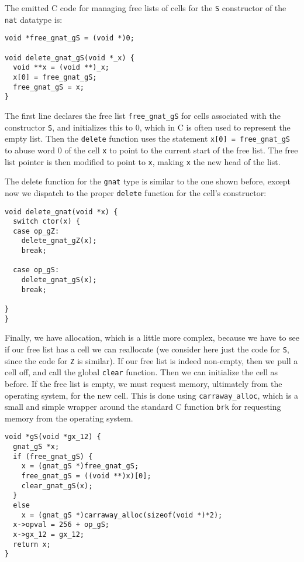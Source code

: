 \documentclass{book}[12pt]
\begin{document}
The emitted C code for managing free lists of cells for the \texttt{S}
constructor of the \texttt{nat} datatype is:

\begin{verbatim}
void *free_gnat_gS = (void *)0;

void delete_gnat_gS(void *_x) {
  void **x = (void **)_x;
  x[0] = free_gnat_gS;
  free_gnat_gS = x;
}
\end{verbatim}

\noindent The first line declares the free list
\texttt{free\_gnat\_gS} for cells associated with the constructor
\texttt{S}, and initializes this to $0$, which in C is often used to
represent the empty list.  Then the \texttt{delete} function uses the
statement \texttt{x[0] = free\_gnat\_gS} to abuse word 0 of the cell
\texttt{x} to point to the current start of the free list.  The free
list pointer is then modified to point to \texttt{x}, making
\texttt{x} the new head of the list.  

The delete function for the \texttt{gnat} type is similar to the one
shown before, except now we dispatch to the proper \texttt{delete}
function for the cell's constructor:

\begin{verbatim}
void delete_gnat(void *x) {
  switch ctor(x) {
  case op_gZ: 
    delete_gnat_gZ(x);
    break;

  case op_gS: 
    delete_gnat_gS(x);
    break;

}
}
\end{verbatim}

Finally, we have allocation, which is a little more complex, because
we have to see if our free list has a cell we can reallocate (we
consider here just the code for \texttt{S}, since the code for
\texttt{Z} is similar).  If our free list is indeed non-empty, then we
pull a cell off, and call the global \texttt{clear} function.  Then we
can initialize the cell as before.  If the free list is empty, we must
request memory, ultimately from the operating system, for the new
cell.  This is done using \texttt{carraway\_alloc}, which is a small
and simple wrapper around the standard C function \texttt{brk} for
requesting memory from the operating system.

\begin{verbatim}
void *gS(void *gx_12) {
  gnat_gS *x;
  if (free_gnat_gS) {
    x = (gnat_gS *)free_gnat_gS;
    free_gnat_gS = ((void **)x)[0];
    clear_gnat_gS(x);
  }
  else
    x = (gnat_gS *)carraway_alloc(sizeof(void *)*2);
  x->opval = 256 + op_gS;
  x->gx_12 = gx_12;
  return x;
}
\end{verbatim}
\end{document}

